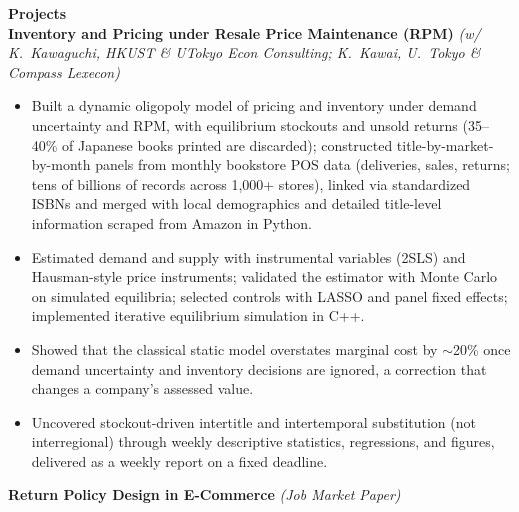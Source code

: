 \documentclass[11pt,letterpaper]{article}
\begin{document}
{\large \textbf{Projects}}\\[-0.5pt]
\textbf{Inventory and Pricing under Resale Price Maintenance (RPM)} \textit{(w/ K.\ Kawaguchi, HKUST \& UTokyo Econ Consulting; K.\ Kawai, U.\ Tokyo \& Compass Lexecon)}\\
\vspace{-6pt}
\begin{itemize}
  \item Built a dynamic oligopoly model of pricing and inventory under demand uncertainty and RPM, with equilibrium stockouts and unsold returns (35--40\% of Japanese books printed are discarded); constructed title-by-market-by-month panels from monthly bookstore POS data (deliveries, sales, returns; tens of billions of records across 1{,}000+ stores), linked via standardized ISBNs and merged with local demographics and detailed title-level information scraped from Amazon in Python.
  \item Estimated demand and supply with instrumental variables (2SLS) and Hausman-style price instruments; validated the estimator with Monte Carlo on simulated equilibria; selected controls with LASSO and panel fixed effects; implemented iterative equilibrium simulation in C++.
  \item Showed that the classical static model overstates marginal cost by \(\sim\)20\% once demand uncertainty and inventory decisions are ignored, a correction that changes a company's assessed value.
  \item Uncovered stockout-driven intertitle and intertemporal substitution (not interregional) through weekly descriptive statistics, regressions, and figures, delivered as a weekly report on a fixed deadline.
\end{itemize}
\vspace{-3pt}
\textbf{Return Policy Design in E-Commerce} \textit{(Job Market Paper)}\\
\vspace{-6pt}
\end{document}
